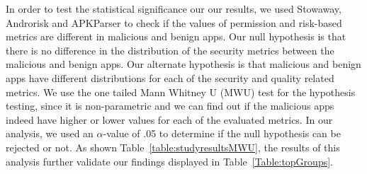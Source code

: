 \documentclass{sig-alternate-05-2015}
\newcommand{\todo}[1]{\textcolor{cyan}{\textbf{[#1]}}}
\begin{document}
In order to test the statistical significance our our results, we used Stowaway, Androrisk and APKParser to check if the values of permission and risk-based metrics are different in malicious and benign apps. Our null hypothesis is that there is no difference in the distribution of the security metrics between the malicious and benign apps. Our alternate hypothesis is that malicious and benign apps have different distributions for each of the security and quality related metrics. We use the one tailed Mann Whitney U (MWU) test for the hypothesis testing, since it is non-parametric and we can find out if the malicious apps indeed have higher or lower values for each of the evaluated metrics. In our analysis, we used an $\alpha$-value of .05 to determine if the null hypothesis can be rejected or not. As shown Table~\ref{table:studyresultsMWU}, the results of this analysis further validate our findings displayed in Table~\ref{Table:topGroups}.








\end{document}
